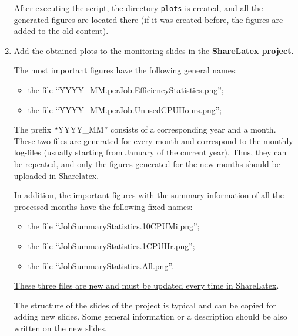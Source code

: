 \documentclass[12pt,a4paper,onecolumn]{article}
\begin{document}
\begin{enumerate}
After executing the script, the directory \lstinline{plots} is created, and all the generated figures are located there (if it was created before, the figures are added to the old content).

\item Add the obtained plots to the monitoring slides in the \textbf{ShareLatex project}.

The most important figures have the following general names:
\begin{itemize}
\item the file ``YYYY\_MM.perJob.EfficiencyStatistics.png'';
\item the file ``YYYY\_MM.perJob.UnusedCPUHours.png'';
\end{itemize}
The prefix ``YYYY\_MM'' consists of a corresponding year and a month.
These two files are generated for every month and correspond to the monthly log-files (usually starting from January of the current year).
Thus, they can be repeated, and only the figures generated for the new months should be uploaded in Sharelatex.

In addition, the important figures with the summary information of all the processed months have the following fixed names:
\begin{itemize}
\item the file ``JobSummaryStatistics.10CPUMi.png'';
\item the file ``JobSummaryStatistics.1CPUHr.png'';
\item the file ``JobSummaryStatistics.All.png''.
\end{itemize}
\ul{These three files are new and must be updated every time in ShareLatex}.

The structure of the slides of the project is typical and can be copied for adding new slides.
Some general information or a description should be also written on the new slides.

\end{enumerate}

\end{document}
